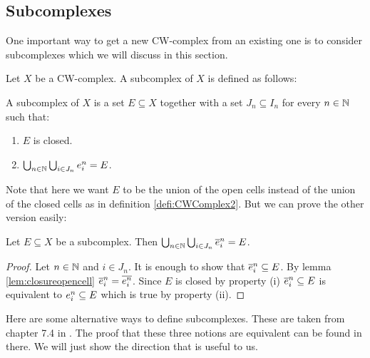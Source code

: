 \subsection{Subcomplexes}

One important way to get a new CW-complex from an existing one is to consider subcomplexes which we will discuss in this section. 

Let $X$ be a CW-complex. A subcomplex of $X$ is defined as follows:

\begin{defi} \label{defi:subcomplex}
    A subcomplex of $X$ is a set $E \subseteq X$ together with a set $J_n \subseteq I_n$ for every $n \in \bN$ such that:
    \begin{enumerate}
        \item $E$ is closed.
        \item $\bigcup_{n \in \bN} \bigcup_{i \in J_n} \openCell{n}{i} = E$.
    \end{enumerate}
\end{defi}

Note that here we want $E$ to be the union of the open cells instead of the union of the closed cells as in definition \ref{defi:CWComplex2}. 
But we can prove the other version easily: 

\begin{lem} \label{lem:subcomplexunionclosed}
    Let $E \subseteq X$ be a subcomplex. 
    Then $\bigcup_{n \in \bN} \bigcup_{i \in J_n} \closedCell{n}{i} = E$.
\end{lem}
\begin{proof}
    Let $n \in \bN$ and $i \in J_n$. 
    It is enough to show that $\closedCell{n}{i} \subseteq E$. 
    By lemma \ref{lem:closureopencell} $\closedCell{n}{i} = \closure{\openCell{n}{i}}$. 
    Since $E$ is closed by property (i) $\closedCell{n}{i} \subseteq E$ is equivalent to $\openCell{n}{i} \subseteq E$ which is true by property (ii).
\end{proof}

Here are some alternative ways to define subcomplexes. 
These are taken from chapter 7.4 in \cite{Jänich2001}.
The proof that these three notions are equivalent can be found in there. 
We will just show the direction that is useful to us. 

